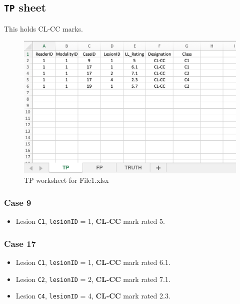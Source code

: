 \documentclass[
]{book}
\providecommand{\tightlist}{%
  \setlength{\itemsep}{0pt}\setlength{\parskip}{0pt}}
\begin{document}
\hypertarget{classification-tasks-example1-tp}{%
\subsection{\texorpdfstring{\texttt{TP} sheet}{TP sheet}}\label{classification-tasks-example1-tp}}

This holds CL-CC marks.

\begin{figure}

{\centering \includegraphics[width=0.5\linewidth,height=0.2\textheight]{images/classification/File1TP} 

}

\caption{TP worksheet for File1.xlsx}\label{fig:File1TP}
\end{figure}

\hypertarget{classification-tasks-example1-case9}{%
\subsubsection{Case 9}\label{classification-tasks-example1-case9}}

\begin{itemize}
\tightlist
\item
  Lesion \texttt{C1}, \texttt{lesionID} = 1, \textbf{CL-CC} mark rated 5.
\end{itemize}

\hypertarget{classification-tasks-example1-case17}{%
\subsubsection{Case 17}\label{classification-tasks-example1-case17}}

\begin{itemize}
\tightlist
\item
  Lesion \texttt{C1}, \texttt{lesionID} = 1, \textbf{CL-CC} mark rated 6.1.
\item
  Lesion \texttt{C2}, \texttt{lesionID} = 2, \textbf{CL-CC} mark rated 7.1.
\item
  Lesion \texttt{C4}, \texttt{lesionID} = 4, \textbf{CL-CC} mark rated 2.3.
\end{itemize}
\end{document}
